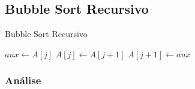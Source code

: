 \newpage

\subsection{Bubble Sort Recursivo}

\begin{algorithm}
    \caption{Bubble Sort Recursivo}
    \label{algo:bubble_sort_recursivo}
    \begin{algorithmic}[1]
        \Statex
                \Return{}
            \EndIf
                    \State $aux \gets A[j]$
                    \State $A[j] \gets A[j + 1]$
                    \State $A[j + 1] \gets aux$
                \EndIf
            \EndFor
            \State {}
        \EndFunction
    \end{algorithmic}
\end{algorithm}

\subsubsection{Análise}










